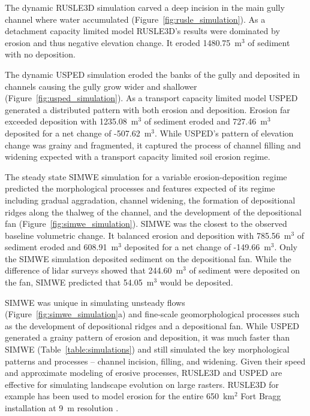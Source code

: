 \documentclass[gmd, manuscript]{copernicus}
\begin{document}
The dynamic RUSLE3D simulation 
carved a deep incision 
in the main gully channel
where water accumulated
(Figure~\ref{fig:rusle_simulation}).
As a detachment capacity limited model
RUSLE3D's results were
dominated by erosion and 
thus negative elevation change.
It eroded 1480.75~\unit{m}$^3$ of sediment
with no deposition.

The dynamic USPED simulation
eroded the banks of the gully
and deposited in channels
causing the gully grow wider and shallower
(Figure~\ref{fig:usped_simulation}). 
As a transport capacity limited model
USPED generated a distributed pattern
with both erosion and deposition.
Erosion far exceeded deposition with
1235.08~\unit{m}$^3$ of sediment eroded 
and 727.46~\unit{m}$^3$ deposited
for a net change of -507.62~\unit{m}$^3$.
While USPED's pattern of elevation change
was grainy and fragmented, 
it captured the process of channel 
filling and widening expected with 
a transport capacity limited soil erosion regime.

The steady state SIMWE simulation
for a variable erosion-deposition regime
predicted the morphological processes and features
expected of its regime including
gradual aggradation,
channel widening,
the formation of depositional ridges
along the thalweg of the channel,
and the development of the depositional fan
(Figure~\ref{fig:simwe_simulation}).
SIMWE was the closest to the observed baseline
volumetric change.
It balanced erosion and deposition with 
785.56~\unit{m}$^3$ of sediment eroded
and 608.91~\unit{m}$^3$ deposited
for a net change of -149.66~\unit{m}$^3$.
Only the SIMWE simulation deposited sediment
on the depositional fan. 
While the difference of lidar surveys showed
that 244.60~\unit{m}$^3$ of sediment 
were deposited on the fan,
SIMWE predicted that 54.05~\unit{m}$^3$
would be deposited.

SIMWE was unique in simulating unsteady flows 
(Figure~\ref{fig:simwe_simulation}a)
and fine-scale geomorphological processes 
such as the development of depositional ridges 
and a depositional fan. 
%
While USPED generated a grainy pattern of erosion and deposition,
it was much faster than SIMWE 
(Table~\ref{table:simulations})
and still simulated 
the key morphological patterns and processes -- 
channel incision, filling, and widening. 
%
Given their speed
and approximate modeling of erosive processes, 
RUSLE3D and USPED 
are effective for simulating landscape evolution
on large rasters.
RUSLE3D for example has been used to
model erosion for the entire 650~\unit{km}$^{2}$ 
Fort Bragg installation at 9~\unit{m} resolution
\citep{Levine2018}. 
\end{document}
